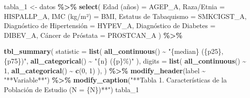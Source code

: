 \documentclass[
]{article}
\newenvironment{Shaded}{\begin{snugshade}}{\end{snugshade}}
\newcommand{\AttributeTok}[1]{\textcolor[rgb]{0.13,0.29,0.53}{#1}}
\newcommand{\DecValTok}[1]{\textcolor[rgb]{0.00,0.00,0.81}{#1}}
\newcommand{\FunctionTok}[1]{\textcolor[rgb]{0.13,0.29,0.53}{\textbf{#1}}}
\newcommand{\NormalTok}[1]{#1}
\newcommand{\OtherTok}[1]{\textcolor[rgb]{0.56,0.35,0.01}{#1}}
\newcommand{\SpecialCharTok}[1]{\textcolor[rgb]{0.81,0.36,0.00}{\textbf{#1}}}
\newcommand{\StringTok}[1]{\textcolor[rgb]{0.31,0.60,0.02}{#1}}
\begin{document}
\begin{Shaded}
\begin{Highlighting}[]
\NormalTok{tabla\_1 }\OtherTok{\textless{}{-}}\NormalTok{ datos }\SpecialCharTok{\%\textgreater{}\%}
  \FunctionTok{select}\NormalTok{(}
    \StringTok{\textasciigrave{}}\AttributeTok{Edad (años)}\StringTok{\textasciigrave{}} \OtherTok{=}\NormalTok{ AGEP\_A,}
    \StringTok{\textasciigrave{}}\AttributeTok{Raza/Etnia}\StringTok{\textasciigrave{}} \OtherTok{=}\NormalTok{ HISPALLP\_A,}
    \StringTok{\textasciigrave{}}\AttributeTok{IMC (kg/m²)}\StringTok{\textasciigrave{}} \OtherTok{=}\NormalTok{ BMI,}
    \StringTok{\textasciigrave{}}\AttributeTok{Estatus de Tabaquismo}\StringTok{\textasciigrave{}} \OtherTok{=}\NormalTok{ SMKCIGST\_A,}
    \StringTok{\textasciigrave{}}\AttributeTok{Diagnóstico de Hipertensión}\StringTok{\textasciigrave{}} \OtherTok{=}\NormalTok{ HYPEV\_A,}
    \StringTok{\textasciigrave{}}\AttributeTok{Diagnóstico de Diabetes}\StringTok{\textasciigrave{}} \OtherTok{=}\NormalTok{ DIBEV\_A,}
    \StringTok{\textasciigrave{}}\AttributeTok{Cáncer de Próstata}\StringTok{\textasciigrave{}} \OtherTok{=}\NormalTok{ PROSTCAN\_A}
\NormalTok{  ) }\SpecialCharTok{\%\textgreater{}\%}

  \FunctionTok{tbl\_summary}\NormalTok{(}
    \AttributeTok{statistic =} \FunctionTok{list}\NormalTok{(}
      \FunctionTok{all\_continuous}\NormalTok{() }\SpecialCharTok{\textasciitilde{}} \StringTok{"\{median\} (\{p25\}, \{p75\})"}\NormalTok{,}
      \FunctionTok{all\_categorical}\NormalTok{() }\SpecialCharTok{\textasciitilde{}} \StringTok{"\{n\} (\{p\}\%)"}
\NormalTok{    ),}
    \AttributeTok{digits =} \FunctionTok{list}\NormalTok{(}
      \FunctionTok{all\_continuous}\NormalTok{() }\SpecialCharTok{\textasciitilde{}} \DecValTok{1}\NormalTok{,}
      \FunctionTok{all\_categorical}\NormalTok{() }\SpecialCharTok{\textasciitilde{}} \FunctionTok{c}\NormalTok{(}\DecValTok{0}\NormalTok{, }\DecValTok{1}\NormalTok{)}
\NormalTok{    ),}
\NormalTok{  ) }\SpecialCharTok{\%\textgreater{}\%}
  \FunctionTok{modify\_header}\NormalTok{(label }\SpecialCharTok{\textasciitilde{}} \StringTok{"**Variable**"}\NormalTok{) }\SpecialCharTok{\%\textgreater{}\%}
  \FunctionTok{modify\_caption}\NormalTok{(}\StringTok{"**Tabla 1. Características de la Población de Estudio (N = \{N\})**"}\NormalTok{)}
\NormalTok{tabla\_1}
\end{Highlighting}
\end{Shaded}
\end{document}
